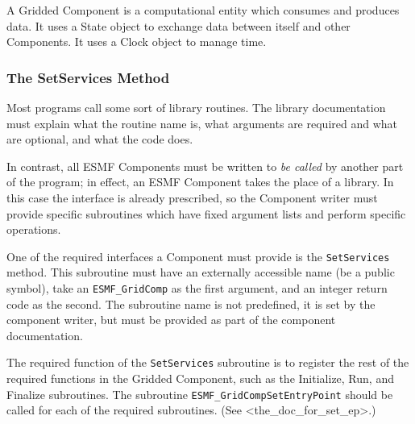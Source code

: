 %


A Gridded Component is a computational entity which
consumes and produces data.  It uses a State object to
exchange data between itself and other Components.  It 
uses a Clock object to manage time.

\subsubsection{The SetServices Method}

Most programs call some sort of library routines.  The library
documentation must explain what the routine name is, what arguments 
are required and what are optional, and what the code does.  

In contrast, all ESMF Components must be written to {\it be called}
by another part of the program; in effect, an ESMF Component takes the 
place of a library.  In this case the interface is already prescribed,
so the Component writer must provide specific subroutines which 
have fixed argument lists and perform specific operations.

One of the required interfaces a Component must provide is 
the {\tt SetServices} method.  This subroutine must have an
externally accessible name (be a public symbol), take an {\tt ESMF\_GridComp}
as the first argument, and an integer return code as the second.
The subroutine name is not predefined, it is set by the component
writer, but must be provided as part of the component documentation.

The required function of the {\tt SetServices} subroutine is to
register the rest of the required functions in the Gridded Component,
such as the Initialize, Run, and Finalize subroutines.  The subroutine
{\tt ESMF\_GridCompSetEntryPoint} should be called for
each of the required subroutines.  (See <the_doc_for_set_ep>.) 

